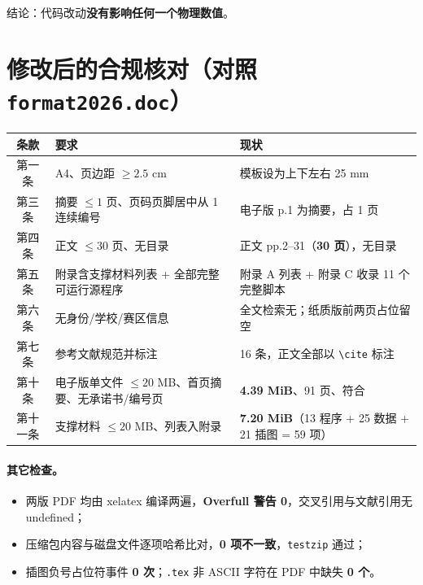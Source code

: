 \documentclass[11pt,a4paper]{ctexart}
\newcommand{\src}[1]{\texttt{#1}}
\begin{document}
\noindent 结论：代码改动\textbf{没有影响任何一个物理数值}。

\section{修改后的合规核对（对照 \src{format2026.doc}）}

\begin{center}
\small
\begin{tabular}{@{}clp{}@{}}
\toprule
\textbf{条款} & \textbf{要求} & \textbf{现状} \\
\midrule
第一条 & A4、页边距 $\ge2.5$ cm & 模板设为上下左右 25 mm \\
第三条 & 摘要 $\le1$ 页、页码页脚居中从 1 连续编号 & 电子版 p.1 为摘要，占 1 页 \\
第四条 & 正文 $\le30$ 页、无目录 & 正文 pp.2--31（\textbf{30 页}），无目录 \\
第五条 & 附录含支撑材料列表 + 全部完整可运行源程序 & 附录 A 列表 + 附录 C 收录 11 个完整脚本 \\
第六条 & 无身份/学校/赛区信息 & 全文检索无；纸质版前两页占位留空 \\
第七条 & 参考文献规范并标注 & 16 条，正文全部以 \src{\textbackslash cite} 标注 \\
第十条 & 电子版单文件 $\le20$ MB、首页摘要、无承诺书/编号页 & \textbf{4.39 MiB}、91 页、符合 \\
第十一条 & 支撑材料 $\le20$ MB、列表入附录 & \textbf{7.20 MiB}（13 程序 + 25 数据 + 21 插图 = 59 项） \\
\bottomrule
\end{tabular}
\end{center}

\paragraph{其它检查。}
\begin{itemize}[leftmargin=1.6em,itemsep=2pt]
  \item 两版 PDF 均由 xelatex 编译两遍，\textbf{Overfull 警告 0}，交叉引用与文献引用无 undefined；
  \item 压缩包内容与磁盘文件逐项哈希比对，\textbf{0 项不一致}，\src{testzip} 通过；
  \item 插图负号占位符事件 \textbf{0 次}；\src{.tex} 非 ASCII 字符在 PDF 中缺失 \textbf{0 个}。
\end{itemize}

\end{document}
